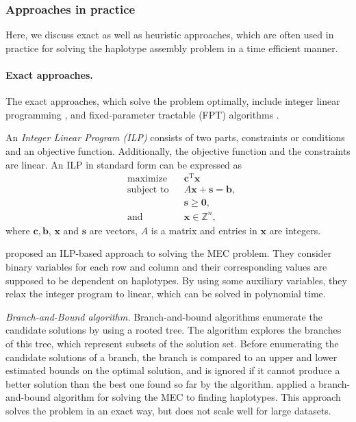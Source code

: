 \subsubsection{Approaches in practice}
Here, we discuss exact as well as heuristic approaches, which are often used in practice for solving the haplotype assembly problem in a time efficient manner.
\paragraph{Exact approaches.} The exact approaches, which solve the problem optimally, include integer linear programming \citep{Fouilhoux2012,CDW13_exact}, and fixed-parameter tractable (FPT) algorithms \citep{he2010optimal,Patterson2015,Pirola2015}.

An \textit{Integer Linear Program (ILP)} consists of two parts, constraints or conditions and an objective function. Additionally, the objective function and the constraints are linear.
An ILP in standard form can be expressed as
\[{\begin{aligned}&{\text{maximize}}&&\mathbf {c} ^{\mathrm {T} }\mathbf {x} \\&{\text{subject to}}&&A\mathbf {x} +\mathbf {s} =\mathbf {b} ,\\&&&\mathbf {s} \geq \mathbf {0} ,\\&{\text{and}}&&\mathbf {x} \in \mathbb {Z} ^{n},\end{aligned}}\]
where $\displaystyle \mathbf {c} ,\mathbf {b} $, $\mathbf {x}$ and $\mathbf {s}$ are vectors, $\displaystyle A $ is a matrix and entries in $\mathbf {x}$ are integers.

\cite{CDW13_exact} proposed an ILP-based approach to solving the MEC problem.
They consider binary variables for each row and column and their corresponding values are supposed to be dependent on haplotypes.
By using some auxiliary variables, they relax the integer program to linear, which can be solved in polynomial time.

\textit{Branch-and-Bound algorithm.}
Branch-and-bound algorithms enumerate the candidate solutions by using a rooted tree.
The algorithm explores the branches of this tree, which represent subsets of the solution set.
Before enumerating the candidate solutions of a branch, the branch is compared to an upper and lower estimated bounds on the optimal solution, and is ignored if it cannot produce a better solution than the best one found so far by the algorithm.
\cite{wang2005haplotype} applied a branch-and-bound algorithm for solving the MEC to finding haplotypes. This approach solves the problem in an exact way, but does not scale well for large datasets.

